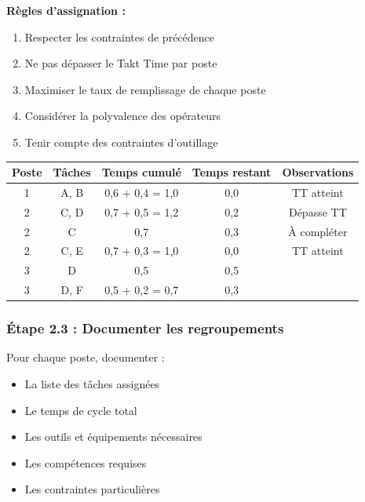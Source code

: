 \documentclass[12pt,a4paper]{article}
\newenvironment{methodbox}[1]
  {\begin{tcolorbox}[colback=blue!5!white, colframe=methodcolor, title=#1]\small}
  {\end{tcolorbox}}
\begin{document}
\textbf{Règles d'assignation :}
\begin{enumerate}
    \item Respecter les contraintes de précédence
    \item Ne pas dépasser le Takt Time par poste
    \item Maximiser le taux de remplissage de chaque poste
    \item Considérer la polyvalence des opérateurs
    \item Tenir compte des contraintes d'outillage
\end{enumerate}

\begin{methodbox}{Tableau d'assignation des tâches}
\begin{table}[H]
\centering
\begin{tabular}{|c|c|c|c|c|}
\hline
\textbf{Poste} & \textbf{Tâches} & \textbf{Temps cumulé} & \textbf{Temps restant} & \textbf{Observations} \\
\hline
1 & A, B & 0,6 + 0,4 = 1,0 & 0,0 & TT atteint \\
\hline
2 & C, D & 0,7 + 0,5 = 1,2 & 0,2 & Dépasse TT \\
\hline
2 & C & 0,7 & 0,3 & À compléter \\
\hline
2 & C, E & 0,7 + 0,3 = 1,0 & 0,0 & TT atteint \\
\hline
3 & D & 0,5 & 0,5 & \\
\hline
3 & D, F & 0,5 + 0,2 = 0,7 & 0,3 & \\
\hline
\end{tabular}
\end{table}
\end{methodbox}

\subsubsection{Étape 2.3 : Documenter les regroupements}

Pour chaque poste, documenter :
\begin{itemize}
    \item La liste des tâches assignées
    \item Le temps de cycle total
    \item Les outils et équipements nécessaires
    \item Les compétences requises
    \item Les contraintes particulières
\end{itemize}
\end{document}
